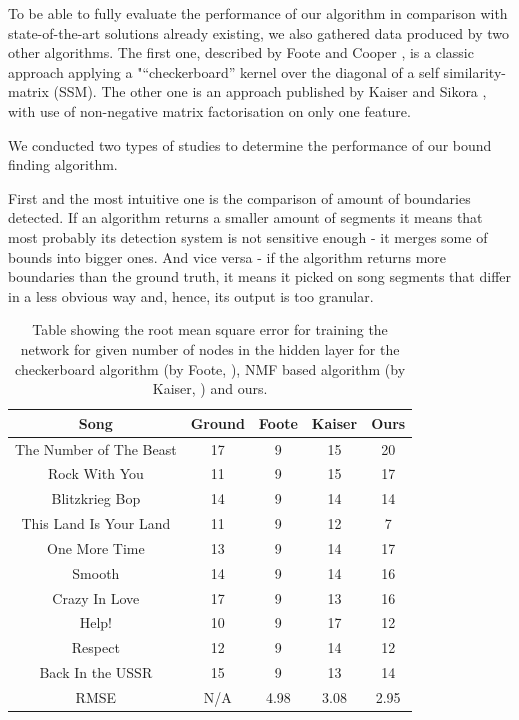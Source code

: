 To be able to fully evaluate the performance of our algorithm in comparison with state-of-the-art solutions already existing, we also gathered data produced by two other algorithms. The first one, described by Foote and Cooper \cite{FooteCooper}, is a classic approach applying a "“checkerboard” kernel over the diagonal of a self similarity-matrix (SSM). The other one is an approach published by Kaiser and Sikora \cite{Sikora}, with use of non-negative matrix factorisation on only one feature. 

We conducted two types of studies to determine the performance of our bound finding algorithm.

First and the most intuitive one is the comparison of amount of boundaries detected. If an algorithm returns a smaller amount of segments it means that most probably its detection system is not sensitive enough - it merges some of bounds into bigger ones. And vice versa - if the algorithm returns more boundaries than the ground truth, it means it picked on song segments that differ in a less obvious way and, hence, its output is too granular.


\begin{table}
\begin{center}
\begin{tabular}{| c | c | c | c | c | } \hline 
Song  								& Ground	& Foote 	&  Kaiser 	& Ours \\ \hline \hline
The Number of The Beast 	&	17			& 	9  			&  15 		&  20   	\\ \hline
Rock With You					&	11			&  9			&  15 		& 17   	\\ \hline
Blitzkrieg Bop 					&	14			&  9  			&  14 		& 14   	\\ \hline
This Land Is Your Land 		&	11			&  9			&  12 		& 7    	\\ \hline
One More Time					&	13			&  9    		&  14 		& 17   	\\ \hline
Smooth								&	14			&  9  			&  14 		& 16  	\\ \hline
Crazy In Love					&	17			&  9  			&  13  		& 16   	\\ \hline
Help!									&	10			&  9		   	&  17 		& 12   	\\ \hline
Respect								&	12			&  9  			&  14 		& 12  	\\ \hline
Back In the USSR				&	15			&  9  			&  13		    	& 14		\\ \hline \hline
RMSE								&	N/A		& 4.98		&  3.08		& 2.95	\\ \hline 

\end{tabular}
\caption{Table showing the root mean square error for training the network for given number of nodes in the hidden layer for the checkerboard algorithm (by Foote, \cite{FooteCooper}), NMF based algorithm (by Kaiser, \cite{Sikora}) and ours.}
\label{table:evalStructureCount}
\end{center}
\end{table}


